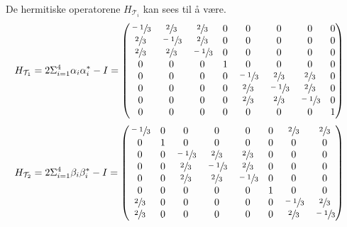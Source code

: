         De hermitiske operatorene $H_{\mathcal{T}_i}$ kan sees til å være.
        \begin{align*}
            H_{\mathcal{T}_1} & = 2\Sigma_{i=1}^4\alpha_i\alpha_i^*-I = 
            \begin{pmatrix}
                \sfrac{-1}{3} & \sfrac{2}{3} & \sfrac{2}{3} & 0 & 0 & 0 & 0 & 0 \\
                \sfrac{2}{3} & \sfrac{-1}{3} & \sfrac{2}{3} & 0 & 0 & 0 & 0 & 0 \\
                \sfrac{2}{3} & \sfrac{2}{3} & \sfrac{-1}{3} & 0 & 0 & 0 & 0 & 0 \\
                0 & 0 & 0 & 1 & 0 & 0 & 0 & 0 \\
                0 & 0 & 0 & 0 & \sfrac{-1}{3} & \sfrac{2}{3} & \sfrac{2}{3} & 0 \\
                0 & 0 & 0 & 0 & \sfrac{2}{3} & \sfrac{-1}{3} & \sfrac{2}{3} & 0 \\
                0 & 0 & 0 & 0 & \sfrac{2}{3} & \sfrac{2}{3} & \sfrac{-1}{3} & 0 \\
                0 & 0 & 0 & 0 & 0 & 0 & 0 & 1 \\
            \end{pmatrix}
        \end{align*}
        \begin{align*}
            H_{\mathcal{T}_2} & = 2\Sigma_{i=1}^4\beta_i\beta_i^*-I = \begin{pmatrix}
                \sfrac{-1}{3} & 0 & 0 & 0 & 0 & 0 & \sfrac{2}{3} & \sfrac{2}{3} \\
                0 & 1 & 0 & 0 & 0 & 0 & 0 & 0 \\
                0 & 0 & \sfrac{-1}{3} & \sfrac{2}{3} & \sfrac{2}{3} & 0 & 0 & 0 \\
                0 & 0 & \sfrac{2}{3} & \sfrac{-1}{3} & \sfrac{2}{3} & 0 & 0 & 0 \\
                0 & 0 & \sfrac{2}{3} & \sfrac{2}{3} & \sfrac{-1}{3} & 0 & 0 & 0 \\
                0 & 0 & 0 & 0 & 0 & 1 & 0 & 0 \\
                \sfrac{2}{3} & 0 & 0 & 0 & 0 & 0 & \sfrac{-1}{3} & \sfrac{2}{3} \\
                \sfrac{2}{3} & 0 & 0 & 0 & 0 & 0 & \sfrac{2}{3} & \sfrac{-1}{3}
            \end{pmatrix}
        \end{align*}
